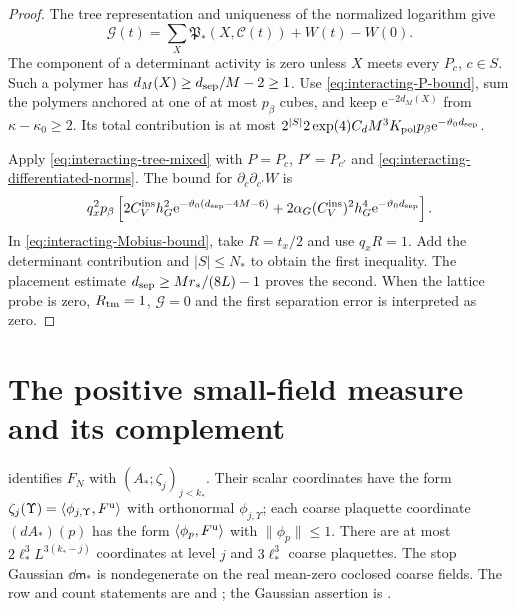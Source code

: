 \begin{proof}
The tree representation and uniqueness of the
normalized logarithm give
\[
 \mathcal G(t)=\sum_X\mathfrak P_*(X,\mathscr C(t))+W(t)-W(0).
\]
The component of a determinant activity is zero
unless $X$ meets every $P_c$, $c\in S$.
Such a polymer has
$d_M(X)\ge d_{\rm sep}/M-2\ge1$.
Use \eqref{eq:interacting-P-bound}, sum the
polymers anchored at one of at most $p_\beta$
cubes, and keep $\mathrm e^{-2d_M(X)}$ from
$\kappa-\kappa_0\ge2$.
Its total contribution is at most
$2^{|S|}2\exp(4)C_dM^3K_{\mathrm{pol}}p_\beta
\mathrm e^{-\vartheta_0d_{\rm sep}}$.

Apply \eqref{eq:interacting-tree-mixed}
with $P=P_c$, $P'=P_{c'}$ and
\eqref{eq:interacting-differentiated-norms}.
The bound for $\partial_c\partial_{c'}W$ is
\[
 q_x^2p_\beta\left[
       2C_V^{\mathrm{ins}}h_G^2\mathrm e^{-\vartheta_0(d_{\rm sep}-4M-6)}
           +2\alpha_G(C_V^{\mathrm{ins}})^2h_G^4\mathrm e^{-\vartheta_0d_{\rm sep}}\right].
\]
In \eqref{eq:interacting-Mobius-bound}, take
$R=t_x/2$ and use $q_xR=1$.
Add the determinant contribution and
$|S|\le N_*$ to obtain the first inequality.
The placement estimate
$d_{\rm sep}\ge Mr_*/(8L)-1$
proves the second.
When the lattice probe is zero,
$R_{\rm tm}=1$, $\mathcal G=0$ and the
first separation error is interpreted as zero.
\end{proof}

\section{The positive small-field measure and its complement}
\label{subsec:interacting-complement}

\cite[Proposition~3.1]{TerminalPressure} identifies $F_N$
with $(A_*;\zeta_j)_{j<k_*}$. Their scalar
coordinates have the form
$\zeta_j(\Upsilon)=\langle\phi_{j,\Upsilon},F^{\rm u}\rangle$
with orthonormal $\phi_{j,\Upsilon}$; each
coarse plaquette coordinate $(dA_*)(p)$ has
the form $\langle\phi_p,F^{\rm u}\rangle$ with
$\|\phi_p\|\le1$.
There are at most $2\ell_*^3L^{3(k_*-j)}$
coordinates at level $j$ and $3\ell_*^3$
coarse plaquettes. The stop Gaussian
$\dd\mathsf m_*$ is nondegenerate on the
real mean-zero coclosed coarse fields.
The row and count statements are
\cite[(13)]{TerminalPressure} and
\cite[(14)]{TerminalPressure}; the
Gaussian assertion is \cite[(12)]{TerminalPressure}.

